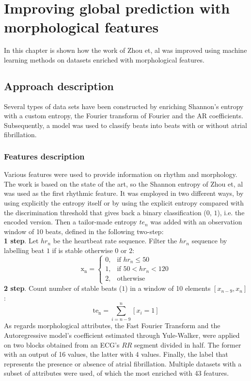 
\chapter{Improving global prediction with morphological features}
\label{sec:global}
In this chapter is shown how the work of Zhou et, al was improved using machine learning methods on datasets enriched with morphological features.

\section{Approach description}
Several types of data sets have been constructed by enriching Shannon's entropy with a custom entropy, the Fourier transform of Fourier and the AR coefficients. Subsequently, a model was used to classify beats into beats with or without atrial fibrillation.

\subsection{Features description}
Various features were used to provide information on rhythm and morphology. The work is based on the state of the art, so the Shannon entropy of Zhou et, al was used as the first rhythmic feature. It was employed in two different ways, by using explicitly the entropy itself or by using the explicit entropy compared with the discrimination threshold that gives back a binary classification ($0$, $1$), i.e. the encoded version. Then a tailor-made entropy $te_n$ was added with an observation window of 10 beats, defined in the following two-step:\\
\textbf{1 step}. Let $hr_n$ be the heartbeat rate sequence. Filter the $hr_n$ sequence by labelling beat $1$ if is stable otherwise $0$ or $2$:\\
\begin{equation}
\mathrm{x_n} = \begin{cases}
	0, & \text{if } hr_n \le 50 \\
	1, & \text{if } 50 < hr_n < 120 \\
    2,              & \text{otherwise} 
\end{cases}
\end{equation}
\textbf{2 step}. Count number of stable beats ($1$) in a window of 10 elements $[x_{n-9}, x_{n}]$:\\
\begin{equation}
\mathrm{te_n} = \sum_{i=n-9}^{n} [x_i=1]
\end{equation}
As regards morphological attributes, the Fast Fourier Transform and the Autoregressive model's coefficient estimated through Yule-Walker, were applied on two blocks obtained from an ECG's $RR$ segment divided in half. The former with an output of 16 values, the latter with 4 values. Finally, the label that represents the presence or absence of atrial fibrillation. Multiple datasets with a subset of attributes were used, of which the most enriched with 43 features.

